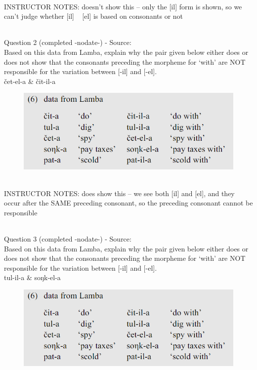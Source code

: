 \documentclass[12pt]{article}
\begin{document}
~\\
INSTRUCTOR NOTES: doesn't show this -- only the [il] form is shown, so we can't judge whether [il] ~ [el] is based on consonants or not


~\\

{\large Question 2} (completed -nodate-) - Source: \\

Based on this data from Lamba, explain why the pair given below either does or does not show that the consonants preceding the morpheme for `with' are NOT responsible for the variation between [-il] and [-el].\\

čet-el-a \& čit-il-a

\begin{figure}[H]
\includegraphics{../images/peng119_lamba.png}
\end{figure}

~\\
INSTRUCTOR NOTES: does show this -- we see both [il] and [el], and they occur after the SAME preceding consonant, so the preceding consonant cannot be responsible


~\\

{\large Question 3} (completed -nodate-) - Source: \\

Based on this data from Lamba, explain why the pair given below either does or does not show that the consonants preceding the morpheme for `with' are NOT responsible for the variation between [-il] and [-el].\\

tul-il-a \& soŋk-el-a

\begin{figure}[H]
\includegraphics{../images/peng119_lamba.png}
\end{figure}
\end{document}
